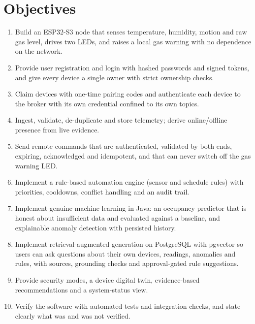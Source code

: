 \documentclass[12pt,a4paper,oneside]{report}
\begin{document}
\section{Objectives}
\begin{enumerate}
  \item Build an ESP32-S3 node that senses temperature, humidity, motion and raw gas level, drives two LEDs, and raises a local gas warning with no dependence on the network.
  \item Provide user registration and login with hashed passwords and signed tokens, and give every device a single owner with strict ownership checks.
  \item Claim devices with one-time pairing codes and authenticate each device to the broker with its own credential confined to its own topics.
  \item Ingest, validate, de-duplicate and store telemetry; derive online/offline presence from live evidence.
  \item Send remote commands that are authenticated, validated by both ends, expiring, acknowledged and idempotent, and that can never switch off the gas warning LED.
  \item Implement a rule-based automation engine (sensor and schedule rules) with priorities, cooldowns, conflict handling and an audit trail.
  \item Implement genuine machine learning in Java: an occupancy predictor that is honest about insufficient data and evaluated against a baseline, and explainable anomaly detection with persisted history.
  \item Implement retrieval-augmented generation on PostgreSQL with pgvector so users can ask questions about their own devices, readings, anomalies and rules, with sources, grounding checks and approval-gated rule suggestions.
  \item Provide security modes, a device digital twin, evidence-based recommendations and a system-status view.
  \item Verify the software with automated tests and integration checks, and state clearly what was and was not verified.
\end{enumerate}
\end{document}
